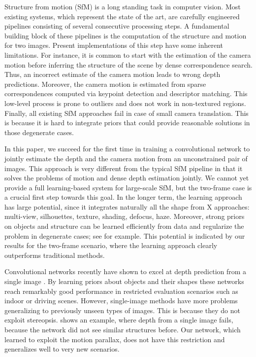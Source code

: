 \documentclass[10pt,twocolumn,letterpaper]{article}
\begin{document}
Structure from motion (SfM) is a long standing task in computer vision. 
Most existing systems, which represent the state of the art, are carefully engineered pipelines consisting of several consecutive processing steps.
A fundamental building block of these pipelines is the computation of the structure and motion for two images. 
Present implementations of this step have some inherent limitations. %
For instance, it is common to start with the estimation of the camera motion before inferring the structure of the scene by dense correspondence search. 
Thus, an incorrect estimate of the camera motion leads to wrong depth predictions. 
Moreover, the camera motion is estimated from sparse correspondences computed via keypoint detection and descriptor matching. 
This low-level process is prone to outliers and does not work in non-textured regions. 
Finally, all existing SfM approaches fail in case of small camera translation. 
This is because it is hard to integrate priors that could provide reasonable solutions in those degenerate cases.

In this paper, we succeed for the first time in training a convolutional network to jointly estimate the depth and the camera motion from an unconstrained pair of images. 
This approach is very different from the typical SfM pipeline in that it solves the problems of motion and dense depth estimation jointly.
We cannot yet provide a full learning-based system for large-scale SfM, but the two-frame case is a crucial first step towards this goal. 
In the longer term, the learning approach has large potential, since it integrates naturally all the shape from X approaches: multi-view, silhouettes, texture, shading, defocus, haze. 
Moreover, strong priors on objects and structure can be learned efficiently from data and regularize the problem in degenerate cases; see  for example. 
This potential is indicated by our results for the two-frame scenario, where the learning approach clearly outperforms traditional methods. 




Convolutional networks recently have shown to excel at depth prediction from a single image \cite{eigen_predicting_2015,eigen_predicting_2014,liu_learning_2015}.
By learning priors about objects and their shapes these networks reach remarkably good performance in restricted evaluation scenarios such as indoor or driving scenes. 
However, single-image methods have more problems generalizing to previously unseen types of images.
This is because they do not exploit stereopsis. 
 shows an example, where depth from a single image fails, because the network did not see similar structures before. 
Our network, which learned to exploit the motion parallax, does not have this restriction and generalizes well to very new scenarios. 
\end{document}
